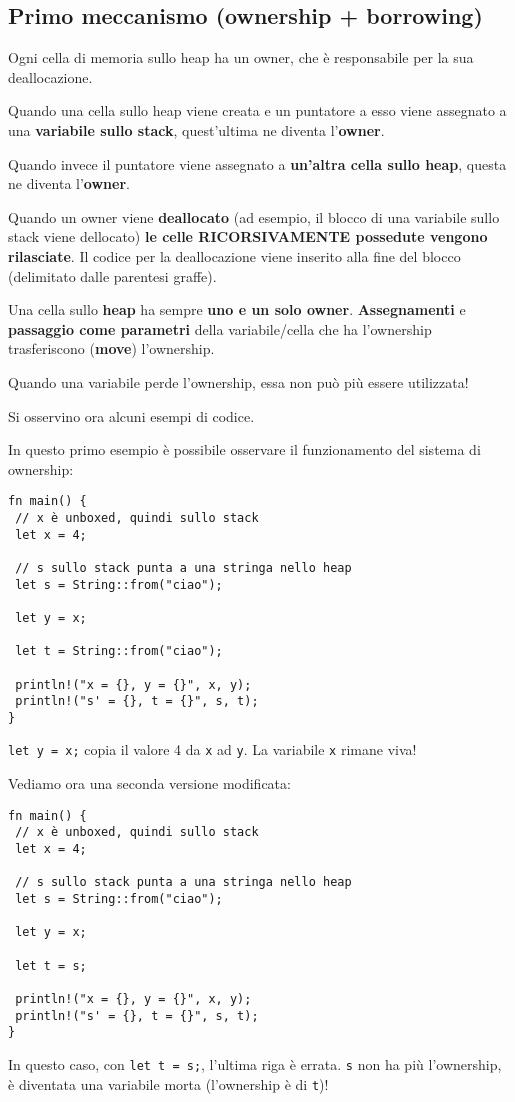 \documentclass{article}
\begin{document}
\subsection*{Primo meccanismo (ownership + borrowing)}
Ogni cella di memoria sullo heap ha un owner, che è responsabile per la sua deallocazione.

Quando una cella sullo heap viene creata e un puntatore a esso viene assegnato a una \textbf{variabile sullo stack}, quest’ultima ne diventa l’\textbf{owner}.

Quando invece il puntatore viene assegnato a \textbf{un’altra cella sullo heap}, questa ne diventa l’\textbf{owner}.

Quando un owner viene \textbf{deallocato} (ad esempio, il blocco di una variabile sullo stack viene dellocato) \textbf{le celle RICORSIVAMENTE possedute vengono rilasciate}. Il codice per la deallocazione viene inserito alla fine del blocco (delimitato dalle parentesi graffe).

Una cella sullo \textbf{heap} ha sempre \textbf{uno e un solo owner}. \textbf{Assegnamenti} e \textbf{passaggio come parametri} della variabile/cella che ha l’ownership trasferiscono (\textbf{move}) l’ownership.

Quando una variabile perde l’ownership, essa non può più essere utilizzata!

Si osservino ora alcuni esempi di codice.

In questo primo esempio è possibile osservare il funzionamento del sistema di ownership:
\begin{tcolorbox}
\begin{verbatim}
fn main() {
 // x è unboxed, quindi sullo stack
 let x = 4; 

 // s sullo stack punta a una stringa nello heap
 let s = String::from("ciao"); 

 let y = x;

 let t = String::from("ciao");

 println!("x = {}, y = {}", x, y);
 println!("s' = {}, t = {}", s, t);
}
\end{verbatim}
\end{tcolorbox}
\texttt{let y = x;} copia il valore 4 da \texttt{x} ad \texttt{y}. La variabile \texttt{x} rimane viva!

Vediamo ora una seconda versione modificata:
\begin{tcolorbox}
\begin{verbatim}
fn main() {
 // x è unboxed, quindi sullo stack
 let x = 4; 

 // s sullo stack punta a una stringa nello heap
 let s = String::from("ciao"); 

 let y = x;

 let t = s;

 println!("x = {}, y = {}", x, y);
 println!("s' = {}, t = {}", s, t);
}
\end{verbatim}
\end{tcolorbox}
In questo caso, con \texttt{let t = s;}, l'ultima riga è errata. \texttt{s} non ha più l'ownership, è diventata una variabile morta (l'ownership è di \texttt{t})!
\end{document}
